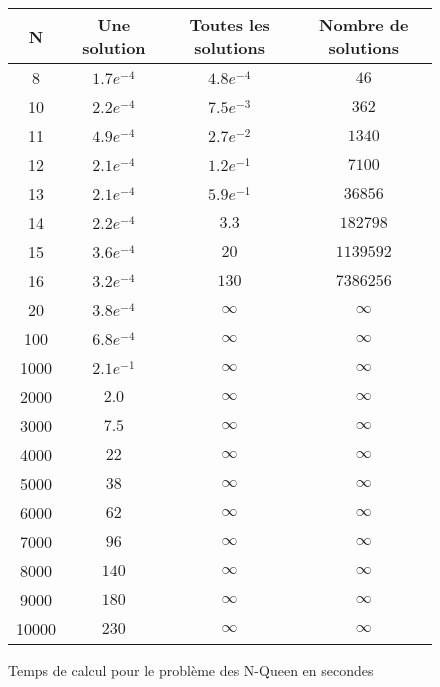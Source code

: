 \begin{figure}[!h]
    \begin{center}
        \begin{tabular}{|c|c|c|c|}
            \hline
            \textbf{N} & \textbf{Une solution} & \textbf{Toutes les solutions} & \textbf{Nombre de solutions} \\ \hline
            8 & $1.7e^{-4}$ & $4.8e^{-4}$ & $46$ \\ \hline
            10 & $2.2e^{-4}$ & $7.5e^{-3}$ & $362$ \\ \hline
            11 & $4.9e^{-4}$ & $2.7e^{-2}$ & $1340$ \\ \hline
            12 & $2.1e^{-4}$ & $1.2e^{-1}$ & $7100$ \\ \hline
            13 & $2.1e^{-4}$ & $5.9e^{-1}$ & $36856$ \\ \hline
            14 & $2.2e^{-4}$ & $3.3$ & $182798$ \\ \hline
            15 & $3.6e^{-4}$ & $20$ & $1139592$ \\ \hline
            16 & $3.2e^{-4}$ & $130$ & $7386256$ \\ \hline
            20 & $3.8e^{-4}$ & $\infty$ & $\infty$ \\ \hline
            100 & $6.8e^{-4}$ & $\infty$ & $\infty$ \\ \hline
            1000 & $2.1e^{-1}$ & $\infty$ & $\infty$ \\ \hline
            2000 & $2.0$ & $\infty$ & $\infty$ \\ \hline
            3000 & $7.5$ & $\infty$ & $\infty$ \\ \hline
            4000 & $22$ & $\infty$ & $\infty$ \\ \hline
            5000 & $38$ & $\infty$ & $\infty$ \\ \hline
            6000 & $62$ & $\infty$ & $\infty$ \\ \hline
            7000 & $96$ & $\infty$ & $\infty$ \\ \hline
            8000 & $140$ & $\infty$ & $\infty$ \\ \hline
            9000 & $180$ & $\infty$ & $\infty$ \\ \hline
            10000 & $230$ & $\infty$ & $\infty$ \\ \hline
        \end{tabular}
        \caption{Temps de calcul pour le problème des N-Queen en secondes}
        \label{Tab-Temps-NQueen}
    \end{center}
\end{figure}

